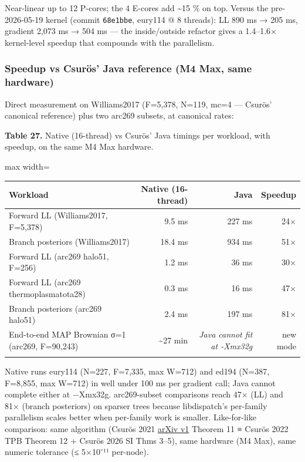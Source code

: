 \documentclass[
  10pt,
]{article}
\begin{document}
Near-linear up to 12 P-cores; the 4 E-cores add \textasciitilde15 \% on
top. Versus the pre-2026-05-19 kernel (commit \texttt{68e1bbe}, eury114
@ 8 threads): LL 890 ms → 205 ms, gradient 2,073 ms → 504 ms --- the
inside/outside refactor gives a 1.4--1.6× kernel-level speedup that
compounds with the parallelism.

\subsubsection{Speedup vs Csurös' Java reference (M4 Max, same
hardware)}\label{speedup-vs-csuruxf6s-java-reference-m4-max-same-hardware}

Direct measurement on Williams2017 (F=5,378, N=119, mc=4 --- Csurös'
canonical reference) plus two arc269 subsets, at canonical rates:

\textbf{Table 27.} Native (16-thread) vs Csurös' Java timings per
workload, with speedup, on the same M4 Max hardware.

\begin{center}
\begin{adjustbox}{max width=\textwidth}
\begin{tabular}{@{}lrrr@{}}
\toprule\noalign{}
Workload & Native (16-thread) & Java & Speedup \\
\midrule\noalign{}
Forward LL (Williams2017, F=5,378) & 9.5 ms & 227 ms & 24× \\
Branch posteriors (Williams2017) & 18.4 ms & 934 ms & 51× \\
Forward LL (arc269 halo51, F=256) & 1.2 ms & 36 ms & 30× \\
Forward LL (arc269 thermoplasmatota28) & 0.3 ms & 16 ms & 47× \\
Branch posteriors (arc269 halo51) & 2.4 ms & 197 ms & 81× \\
End-to-end MAP Brownian σ=1 (arc269, F=90,243) & \textasciitilde27 min &
\emph{Java cannot fit at -Xmx32g} & new mode \\
\bottomrule\noalign{}
\end{tabular}
\end{adjustbox}
\end{center}

Native runs eury114 (N=227, F=7,335, max W=712) and ed194 (N=387,
F=8,855, max W=712) in well under 100 ms per gradient call; Java cannot
complete either at −Xmx32g. arc269-subset comparisons reach 47× (LL) and
81× (branch posteriors) on sparser trees because libdispatch's
per-family parallelism scales better when per-family work is smaller.
Like-for-like comparison: same algorithm (Csurös 2021
\href{https://arxiv.org/abs/2107.11440}{arXiv v1} Theorem 11 ≡ Csurös
2022 TPB Theorem 12 + Csurös 2026 SI Thms 3--5), same hardware (M4 Max),
same numeric tolerance (≤ 5×10⁻¹¹ per-node).
\end{document}
